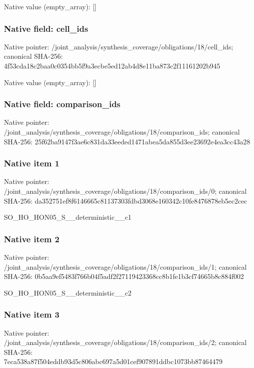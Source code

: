 \documentclass[10pt,a4paper]{article}
\begin{document}
Native value (empty\_\allowbreak{}array): []

\subsubsection{Native field: cell\_\allowbreak{}ids}
Native pointer: /joint\_\allowbreak{}analysis/synthesis\_\allowbreak{}coverage/obligations/18/cell\_\allowbreak{}ids; canonical SHA-256: 4f53cda18c2baa0c0354bb5f9a3ecbe5ed12ab4d8e11ba873c2f11161202b945

Native value (empty\_\allowbreak{}array): []

\subsubsection{Native field: comparison\_\allowbreak{}ids}
Native pointer: /joint\_\allowbreak{}analysis/synthesis\_\allowbreak{}coverage/obligations/18/comparison\_\allowbreak{}ids; canonical SHA-256: 25f62ba9147f3ae6c831da33eeded1471abea5da855d3ee23692e4ea3cc43a28

\subsubsection{Native item 1}
Native pointer: /joint\_\allowbreak{}analysis/synthesis\_\allowbreak{}coverage/obligations/18/comparison\_\allowbreak{}ids/0; canonical SHA-256: da352751ef8f6146665c81137303fdbd3068e160342c10fe8476878eb5ec2cec

\begingroup\raggedright\sloppy SO\_\allowbreak{}HO\_\allowbreak{}HON05\_\allowbreak{}S\_\allowbreak{}\_\allowbreak{}deterministic\_\allowbreak{}\_\allowbreak{}c1\par\endgroup

\subsubsection{Native item 2}
Native pointer: /joint\_\allowbreak{}analysis/synthesis\_\allowbreak{}coverage/obligations/18/comparison\_\allowbreak{}ids/1; canonical SHA-256: 0b5aa9ef5483f766b04f5adf2f27119423368cc8b1fe1b3cf74665b8c884f002

\begingroup\raggedright\sloppy SO\_\allowbreak{}HO\_\allowbreak{}HON05\_\allowbreak{}S\_\allowbreak{}\_\allowbreak{}deterministic\_\allowbreak{}\_\allowbreak{}c2\par\endgroup

\subsubsection{Native item 3}
Native pointer: /joint\_\allowbreak{}analysis/synthesis\_\allowbreak{}coverage/obligations/18/comparison\_\allowbreak{}ids/2; canonical SHA-256: 7eca538a87f504eddb93d5c806abc697a5d01cef907891ddbc1073bb87464479
\end{document}
